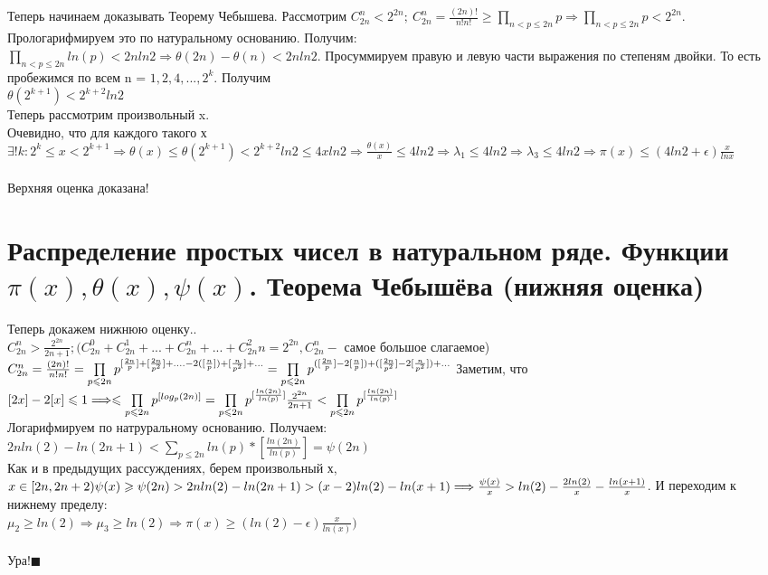 Теперь начинаем доказывать Теорему Чебышева. Рассмотрим $C_{2n}^n < 2^{2n};  \ C_{2n}^n = \frac{(2n)!}{n!n!} \geq \prod\limits_{n < p \leq 2n } p \Longrightarrow \prod\limits_{n < p \leq 2n } p < 2^{2n}$. Прологарифмируем это по натуральному основанию. Получим:\\
$\prod\limits_{n < p \leq 2n } ln(p) < 2n ln 2 \Longrightarrow \theta(2n) - \theta(n) < 2n ln 2$. Просуммируем правую и левую части выражения по степеням двойки. То есть пробежимся по всем n = $1,2,4, ..., 2^k$. Получим \\ $\theta(2^{k+1}) < 2^{k+2} ln 2$\\
Теперь рассмотрим произвольный x. \\Очевидно, что для каждого такого х $\exists !k : 2^k \leq x < 2^{k+1} \Longrightarrow \theta(x) \leq \theta(2^{k+1}) < 2^{k+2}ln 2 \leq 4x ln 2 \Longrightarrow \frac{\theta(x)}{x} \leq 4 ln 2 \Longrightarrow \lambda_1 \leq 4 ln 2 \Longrightarrow \lambda_3 \leq 4 ln 2 \Longrightarrow \pi(x) \leq (4ln 2 + \epsilon)\frac{x}{ln x}$
\\
\\
Верхняя оценка доказана!

\section{Распределение простых чисел в натуральном ряде. Функции $\pi(x), \theta(x), \psi(x)$. Теорема Чебышёва (нижняя оценка)}

Теперь докажем нижнюю оценку..
\\
$C_{2n}^n > \frac{2^{2n}}{2n +1}; (C_{2n}^0 + C_{2n}^1 + ...+ C_{2n}^n +... + C_{2n}^2n = 2^{2n}, C_{2n}^n - $ самое большое слагаемое)
\\
$C_{2n}^n = \frac{(2n)!}{n!n!}  = \prod\limits_{p \leq 2n} p^{[\frac{2n}{p}] +[\frac{2n}{p^2}] + .... - 2([\frac{n}{p}]) + [\frac{n}{p^2}] + ...} = \prod\limits_{p \leq 2n} p^{([\frac{2n}{p}] - 2[\frac{n}{p}]) +([\frac{2n}{p^2}] - 2[\frac{n}{p^2}]) + ...} \\ \\$ Заметим, что $[2x] - 2[x] \leq 1 \Longrightarrow \leq \prod\limits_{p \leq 2n} p^{[log_p(2n)]} = \prod\limits_{p \leq 2n}p^{[\frac{ln(2n)}{ln(p)}]} \\ \\ \frac{2^{2n}}{2n +1} < \prod\limits_{p \leq 2n} p^{[\frac{ln(2n)}{ln(p)}]}$ 
\\
Логарифмируем по натруральному основанию. Получаем:\\
$2n ln( 2) - ln(2n + 1) < \sum\limits_{p \leq 2n} ln (p) * [\frac{ln(2n)}{ln(p)}] = \psi(2n)$
\\
Как и в предыдущих рассуждениях, берем произвольный х, $x \in [2n, 2n+2) \\ \psi(x) \geq \psi(2n) > 2n ln(2) - ln(2n+1) > (x-2)ln(2) - ln(x+1) \Longrightarrow \frac{\psi(x)}{x} > ln(2) - \frac{2ln(2)}{x} - \frac{ln(x+1)}{x}$. И переходим к нижнему пределу:\\
$\mu_2 \geq ln(2) \Longrightarrow \mu_3 \geq ln(2) \Longrightarrow \pi(x) \geq (ln(2) - \epsilon)\frac{x}{ln(x)})$
\\
\\Ура!$\blacksquare$